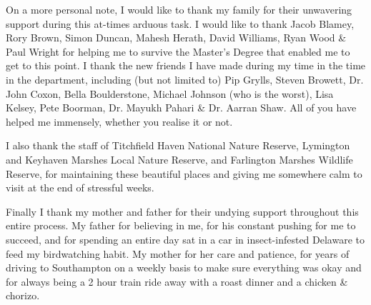 \par On a more personal note, I would like to thank my family for their unwavering support during this at-times arduous task.  I would like to thank Jacob Blamey, Rory Brown, Simon Duncan, Mahesh Herath, David Williams, Ryan Wood \& Paul Wright for helping me to survive the Master's Degree that enabled me to get to this point.  I thank the new friends I have made during my time in the time in the department, including (but not limited to) Pip Grylls, Steven Browett, Dr. John Coxon, Bella Boulderstone, Michael Johnson (who is the worst), Lisa Kelsey, Pete Boorman, Dr. Mayukh Pahari \& Dr. Aarran Shaw.  All of you have helped me immensely, whether you realise it or not.
\par I also thank the staff of Titchfield Haven National Nature Reserve, Lymington and Keyhaven Marshes Local Nature Reserve, and Farlington Marshes Wildlife Reserve, for maintaining these beautiful places and giving me somewhere calm to visit at the end of stressful weeks.
\par Finally I thank my mother and father for their undying support throughout this entire process.  My father for believing in me, for his constant pushing for me to succeed, and for spending an entire day sat in a car in insect-infested Delaware to feed my birdwatching habit.  My mother for her care and patience, for years of driving to Southampton on a weekly basis to make sure everything was okay and for always being a 2 hour train ride away with a roast dinner and a chicken \& chorizo.